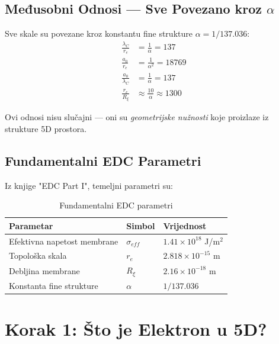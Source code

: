 \documentclass[12pt,a4paper]{article}
\begin{document}
\subsection{Međusobni Odnosi — Sve Povezano kroz $\alpha$}

\begin{keyresult}
Sve skale su povezane kroz konstantu fine strukture $\alpha = 1/137.036$:
\begin{align}
\frac{\lambda_C}{r_e} &= \frac{1}{\alpha} = 137 \\[0.3cm]
\frac{a_0}{r_e} &= \frac{1}{\alpha^2} = 18769 \\[0.3cm]
\frac{a_0}{\lambda_C} &= \frac{1}{\alpha} = 137 \\[0.3cm]
\frac{r_e}{R_\xi} &\approx \frac{10}{\alpha} \approx 1300
\end{align}
\end{keyresult}

Ovi odnosi nisu slučajni — oni su \textit{geometrijske nužnosti} koje proizlaze iz strukture 5D prostora.

\subsection{Fundamentalni EDC Parametri}

Iz knjige "EDC Part I", temeljni parametri su:

\begin{table}[H]
\centering
\begin{tabular}{@{}lll@{}}
\toprule
\textbf{Parametar} & \textbf{Simbol} & \textbf{Vrijednost} \\
\midrule
Efektivna napetost membrane & $\sigma_{eff}$ & $1.41 \times 10^{18}$ J/m$^2$ \\
Topološka skala & $r_e$ & $2.818 \times 10^{-15}$ m \\
Debljina membrane & $R_\xi$ & $2.16 \times 10^{-18}$ m \\
Konstanta fine strukture & $\alpha$ & $1/137.036$ \\
\bottomrule
\end{tabular}
\caption{Fundamentalni EDC parametri}
\end{table}

\section{Korak 1: Što je Elektron u 5D?}
\end{document}
